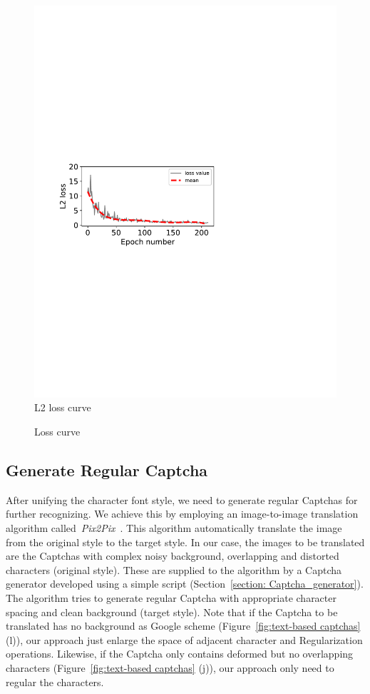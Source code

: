 \begin{figure}
{\begin{minipage}[t]{0.22\textwidth}
      \includegraphics[width=\textwidth]{fig/loss_anlysis/loss_L2.pdf}\\
      \center L2 loss curve
      \end{minipage}
  }
  \caption{Loss curve}
  \label{fig: loss_anlysis}
\end{figure}

\subsection{Generate Regular Captcha}
After unifying the character font style, we need to generate regular Captchas for further recognizing. We achieve this by employing an image-to-image translation algorithm called~\emph{Pix2Pix}~\cite{Pix2PixCode}. This algorithm automatically translate the image from the original style to the target style. In our case, the images to be translated are the Captchas with complex noisy background, overlapping and distorted characters (original style). These are supplied to the algorithm by a Captcha generator developed using a simple script (Section~\ref{section: Captcha_generator}). The algorithm tries to generate regular Captcha with appropriate character spacing and clean background (target style).
Note that if the Captcha to be translated has no background as Google scheme (Figure~\ref{fig:text-based captchas} (l)), our approach just enlarge the space of adjacent character and Regularization operations. Likewise, if the Captcha only contains deformed but no overlapping characters (Figure~\ref{fig:text-based captchas} (j)), our approach only need to regular the characters.

